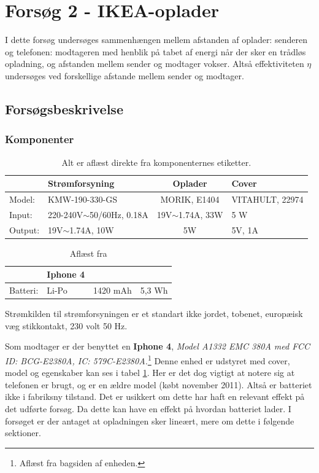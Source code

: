 \section{Forsøg 2 - IKEA-oplader} \label{sec:forsg2}

I dette forsøg undersøges sammenhængen mellem afstanden af oplader: senderen og telefonen: modtageren med henblik på tabet af energi når der sker en trådløs opladning, og afstanden mellem sender og modtager vokser. Altså effektiviteten $\eta$ undersøges ved forskellige afstande mellem sender og modtager.

\subsection{Forsøgsbeskrivelse} 
\subsubsection{Komponenter}

\begin{table}[htbp] %
\begin{tabular}{l|l|c|l}
        & Strømforsyning               & Oplader             & Cover               \\ \hline
Model:  & KMW-190-330-GS               & MORIK, E1404        & VITAHULT, 22974     \\
Input:  & 220-240V$\sim$50/60Hz, 0.18A & 19V$\sim$1.74A, 33W & 5 W       \\	
Output: & 19V$\sim$1.74A, 10W          & 5W                  & 5V, 1A             
\end{tabular}
\caption{Alt er aflæst direkte fra komponenternes etiketter.}
\label{table:sender}
\end{table}


\begin{table}[htbp]
\begin{tabular}{l|lcl}
         & Iphone 4 &          &        \\ \hline
Batteri: & Li-Po     & 1420 mAh & 5,3 Wh
\end{tabular}
\caption{Aflæst fra \cite{batteri}}
\label{table:batteri}
\end{table}

Strømkilden til strømforsyningen er et standart ikke jordet, tobenet, europæisk væg stikkontakt, 230 volt 50 Hz.

Som modtager er der benyttet en \textbf{Iphone 4}, \textit{Model A1332 EMC 380A med FCC ID: BCG-E2380A, IC: 579C-E2380A.}\footnote{Aflæst fra bagsiden af enheden.}
Denne enhed er udstyret med cover, model og egenskaber kan ses i tabel \ref{table:sender}. Her er det dog vigtigt at notere sig at telefonen er brugt, og er en ældre model (købt november 2011). Altså er batteriet ikke i fabriksny tilstand. Det er usikkert om dette har haft en relevant effekt på det udførte forsøg. Da dette kan have en effekt på hvordan batteriet lader. I forsøget er der antaget at opladningen sker lineært, mere om dette i følgende sektioner.

